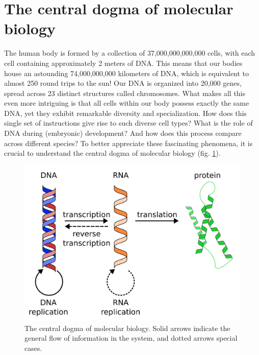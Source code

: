 \section{The central dogma of molecular biology}

The human body is formed by a collection of 37,000,000,000,000 cells\cite{Bianconi2013}, with each cell containing approximately 2 meters of DNA. This means that our bodies house an astounding 74,000,000,000 kilometers of DNA, which is equivalent to almost 250 round trips to the sun! Our DNA is organized into 20,000 genes, spread across 23 distinct structures called chromosomes. What makes all this even more intriguing is that all cells within our body possess exactly the same DNA, yet they exhibit remarkable diversity and specialization. How does this single set of instructions give rise to such diverse cell types? What is the role of DNA during (embryonic) development? And how does this process compare across different species? To better appreciate these fascinating phenomena, it is crucial to understand the central dogma of molecular biology (fig. \ref{fig:central_dogma}).

\begin{figure}[H]
    \includegraphics[width=\linewidth]{ch1.Introduction/imgs/central_dogma.png}
    \caption{The central dogma of molecular biology. Solid arrows indicate the general flow of information in the system, and dotted arrows special cases. }
    \label{fig:central_dogma}
\end{figure}

